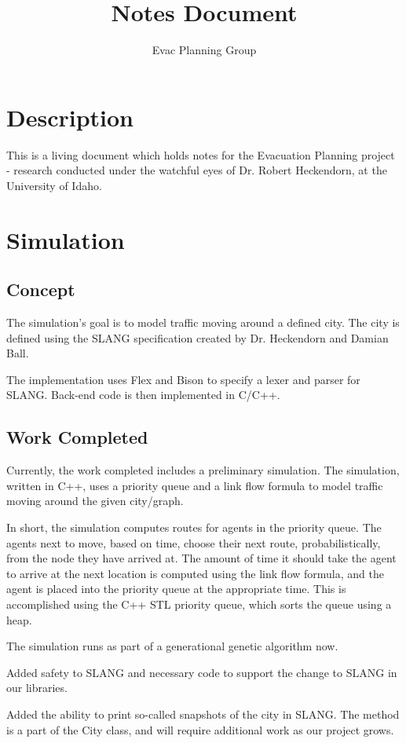 \documentclass[11pt,a4paper]{article}
\author{Evac Planning Group}
\title{Notes Document}
\begin{document}
	\maketitle
	
	
	\section{Description}
	This is a living document which holds notes for the Evacuation Planning project - research conducted under the watchful eyes of Dr. Robert Heckendorn, at the University of Idaho.

	\section{Simulation} 
	\subsection{Concept} The simulation's goal is to model traffic moving around a defined city. The city is defined using the SLANG specification created by Dr. Heckendorn and Damian Ball. 
	
	The implementation uses Flex and Bison to specify a lexer and parser for SLANG. Back-end code is then implemented in C/C++. 
	
	\subsection{Work Completed}
	Currently, the work completed includes a preliminary simulation. The simulation, written in C++, uses a priority queue and a link flow formula to model traffic moving around the given city/graph.
	
	In short, the simulation computes routes for agents in the priority queue. The agents next to move, based on time, choose their next route, probabilistically, from the node they have arrived at. The amount of time it should take the agent to arrive at the next location is computed using the link flow formula, and the agent is placed into the priority queue at the appropriate time. This is accomplished using the C++ STL priority queue, which sorts the queue using a heap.
	
	The simulation runs as part of a generational genetic algorithm now. 
	
	Added safety to SLANG and necessary code to support the change to SLANG in our libraries.
	
	Added the ability to print so-called snapshots of the city in SLANG. The method is a part of the City class, and will require additional work as our project grows.
	
\end{document}
